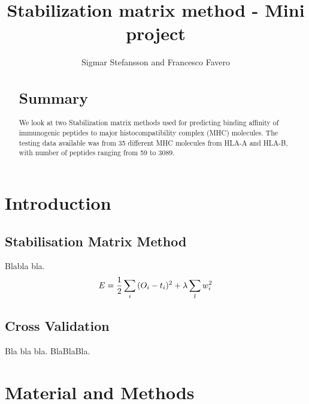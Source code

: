 \documentclass{bioinfo}
\begin{document}
\begin{application}

\title[SMM Project]{Stabilization matrix method - Mini project}
\author[Sigmar Stefansson, Francesco Favero]{Sigmar Stefansson and Francesco Favero}
\address{Danmarks Tekniske Univeristet}



\maketitle

\begin{abstract}

\section{Summary}
We look at two Stabilization matrix methods \cite{SMM} used for predicting binding affinity of immunogenic peptides to major histocompatibility complex \cite{wiki:MHC} (MHC) molecules.
The testing data available was from 35 different MHC molecules from HLA-A and HLA-B, with number of peptides ranging from 59 to 3089.

\end{abstract}

\section*{Introduction}

\subsection*{Stabilisation Matrix Method}
Blabla bla.
\begin{equation}
\label{eq:general}
E = \frac{1}{2} \sum_i{(O_i-t_i)^2} + \lambda \sum_l{w_i^2} \\
\end{equation}

\subsection*{Cross Validation}
Bla bla bla. BlaBlaBla.

\section*{Material and Methods}


\end{application}
\end{document}
